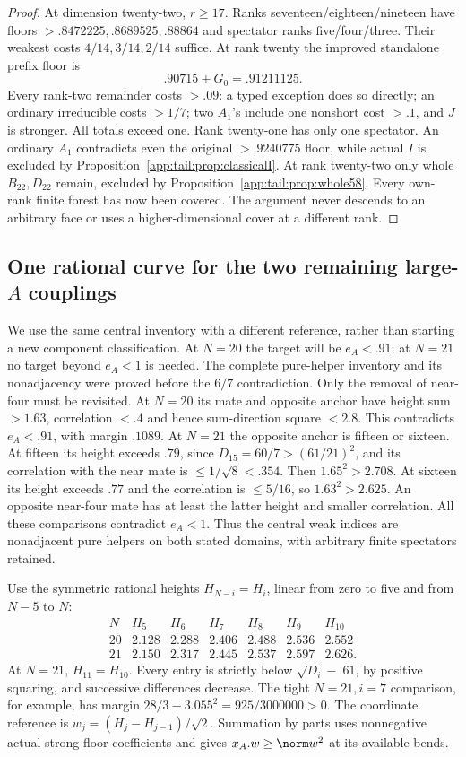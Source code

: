 \begin{proof}
At dimension twenty-two, $r\ge17$. Ranks seventeen/eighteen/nineteen
have floors $>.8472225,.8689525,.88864$ and spectator ranks
five/four/three. Their weakest costs $4/14,3/14,2/14$ suffice.
At rank twenty the improved standalone prefix floor is
\[
 .90715+G_0=.91211125.
\]
Every rank-two remainder costs $>.09$: a typed exception does so
directly; an ordinary irreducible costs $>1/7$; two $A_1$'s include
one nonshort cost $>.1$, and $J$ is stronger. All totals exceed one.
Rank twenty-one has only one spectator. An ordinary $A_1$ contradicts
even the original $>.9240775$ floor, while actual $I$ is excluded
by Proposition~\ref{app:tail:prop:classicalI}. At rank twenty-two
only whole $B_{22},D_{22}$ remain, excluded by
Proposition~\ref{app:tail:prop:whole58}. Every own-rank finite forest
has now been covered. The argument never descends to an arbitrary
face or uses a higher-dimensional cover at a different rank.
\end{proof}

\subsection{One rational curve for the two remaining large-$A$ couplings}
\label{app:tail:Atwoends}
We use the same central inventory with a different reference, rather
than starting a new component classification. At $N=20$ the target
will be $e_A<.91$; at $N=21$ no target beyond $e_A<1$ is needed.
The complete pure-helper inventory and its nonadjacency were proved
before the $6/7$ contradiction. Only the removal of near-four must
be revisited. At $N=20$ its mate and opposite anchor have height
sum $>1.63$, correlation $<.4$ and hence sum-direction square
$<2.8$. This contradicts $e_A<.91$, with margin $.1089$.
At $N=21$ the opposite anchor is fifteen or sixteen. At fifteen its
height exceeds $.79$, since $D_{15}=60/7>(61/21)^2$, and its
correlation with the near mate is $\le1/\sqrt8<.354$.
Then $1.65^2>2.708$. At sixteen its height exceeds $.77$ and
the correlation is $\le5/16$, so $1.63^2>2.625$.
An opposite near-four mate has at least the latter height and smaller
correlation. All these comparisons contradict $e_A<1$.
Thus the central weak indices are nonadjacent pure helpers on both
stated domains, with arbitrary finite spectators retained.

Use the symmetric rational heights $H_{N-i}=H_i$, linear from
zero to five and from $N-5$ to $N$:
\[
\begin{array}{c|rrrrrr}
N&H_5&H_6&H_7&H_8&H_9&H_{10}\\\hline
20&2.128&2.288&2.406&2.488&2.536&2.552\\
21&2.150&2.317&2.445&2.537&2.597&2.626 .
\end{array}
\]
At $N=21$, $H_{11}=H_{10}$. Every entry is strictly below
$\sqrt{D_i}-.61$, by positive squaring, and successive differences
decrease. The tight $N=21,i=7$ comparison, for example, has
margin $28/3-3.055^2=925/3000000>0$.
The coordinate reference is $w_j=(H_j-H_{j-1})/\sqrt2$.
Summation by parts uses nonnegative actual strong-floor coefficients
and gives $x_A.w\ge\norm w^2$ at its available bends.

